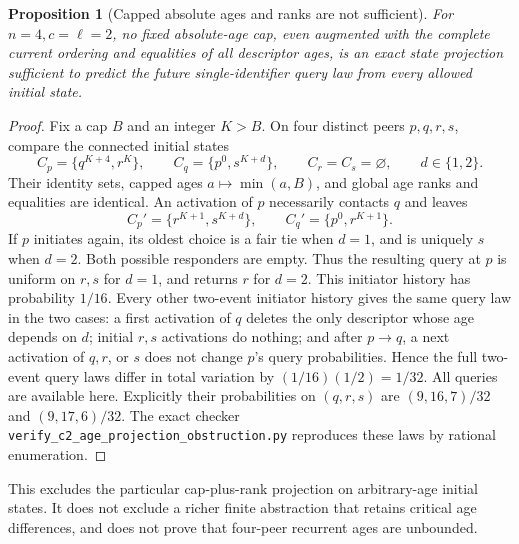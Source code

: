 \documentclass[11pt]{article}
\newtheorem{proposition}[theorem]{Proposition}
\begin{document}
\begin{proposition}[Capped absolute ages and ranks are not sufficient]
\label{prop:c2caprankobstruction}
For $n=4,c=\ell=2$, no fixed absolute-age cap, even augmented
with the complete current ordering and equalities of all
descriptor ages, is an exact state projection sufficient to
predict the future single-identifier query law from every
allowed initial state.
\end{proposition}
\begin{proof}
Fix a cap $B$ and an integer $K>B$. On four distinct peers
$p,q,r,s$, compare the connected initial states
\[
 C_p=\{q^{K+4},r^K\},\qquad
 C_q=\{p^0,s^{K+d}\},\qquad
 C_r=C_s=\varnothing,
 \qquad d\in\{1,2\}.
\]
Their identity sets, capped ages $a\mapsto\min(a,B)$, and
global age ranks and equalities are identical. An activation
of $p$ necessarily contacts $q$ and leaves
\[
 C_p'=\{r^{K+1},s^{K+d}\},\qquad
 C_q'=\{p^0,r^{K+1}\}.
\]
If $p$ initiates again, its oldest choice is a fair tie when
$d=1$, and is uniquely $s$ when $d=2$. Both possible
responders are empty. Thus the resulting query at $p$ is
uniform on $r,s$ for $d=1$, and returns $r$ for $d=2$.
This initiator history has probability $1/16$.
Every other two-event initiator history gives the same query
law in the two cases: a first activation of $q$ deletes the
only descriptor whose age depends on $d$; initial $r,s$
activations do nothing; and after $p\to q$, a next
activation of $q,r$, or $s$ does not change $p$'s query
probabilities. Hence the full two-event query laws differ
in total variation by $(1/16)(1/2)=1/32$.
All queries are available here. Explicitly their probabilities
on $(q,r,s)$ are $(9,16,7)/32$ and $(9,17,6)/32$.
The exact checker
\texttt{verify\_c2\_age\_projection\_obstruction.py}
reproduces these laws by rational enumeration.
\end{proof}

This excludes the particular cap-plus-rank projection on
arbitrary-age initial states. It does not exclude a richer
finite abstraction that retains critical age differences,
and does not prove that four-peer recurrent ages are unbounded.
\end{document}
